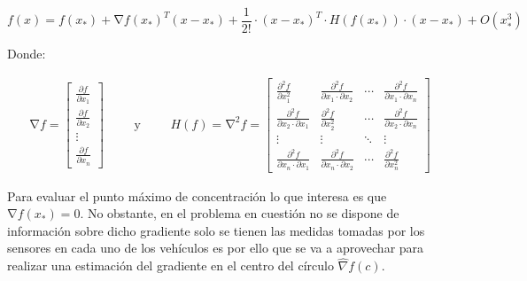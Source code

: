 \begin{equation}\label{TaylorNormal}
	f\left(x\right)=f\left(x_{*}\right)+\mathrm{\nabla}{f}{\left(x_{*}\right)}^{T}\left(x-x_{*}\right)+\frac{1}{2!}\cdot{\left(x-x_{*}\right)}^{T}\cdot{H}\left({f}\left(x_{*}\right)\right) 		\cdot\left(x-x_{*}\right)+O\left(x_{*}^3\right)
\end{equation}

Donde:

\begin{equation*}
	\begin{aligned}
		\mathrm{\nabla}{f}=
	\begin{bmatrix}
		\frac{\partial{f}}{\partial{x}_1} \\
		\frac{\partial{f}}{\partial{x}_2}  \\
		\vdots \\
		\frac{\partial{f}}{\partial{x}_n}
	\end{bmatrix}
	\end{aligned}
	\qquad\text{y}\qquad
	\begin{aligned}
	{H}\left(f\right)=\mathrm{\nabla}^{2}{f}= 	
	\begin{bmatrix}
		\frac{\partial^{2}{f}}{\partial{x}_{1}^{2}} & \frac{\partial^{2}{f}}{\partial{x}_{1}\cdot\partial{x}_{2}} & \cdots & \frac{\partial^{2}{f}}{\partial{x}_{1}\cdot\partial{x}_{n}}\\
		\frac{\partial^{2}{f}}{\partial{x}_{2}\cdot\partial{x}_{1}} & \frac{\partial^{2}{f}}{\partial{x}_{2}^{2}} & \cdots & \frac{\partial^{2}{f}}{\partial{x}_{2}\cdot\partial{x}_{n}}\\
		\vdots & \vdots & \ddots & \vdots\\
		\frac{\partial^{2}{f}}{\partial{x}_{n}\cdot\partial{x}_{1}} & \frac{\partial^{2}{f}}{\partial{x}_{n}\cdot\partial{x}_{2}} & \cdots & \frac{\partial^{2}{f}}{\partial{x}_{n}^{2}}
	\end{bmatrix}
	\end{aligned}
\end{equation*}

Para evaluar el punto máximo de concentración lo que interesa es que $\mathrm{\nabla}{f}{\left(x_{*}\right)}=0$. No obstante, en el problema en cuestión no se dispone de información sobre dicho gradiente solo se tienen las medidas tomadas por los sensores en cada uno de los vehículos es por ello que se va a aprovechar para realizar una estimación del gradiente en el centro del círculo $\hat{\nabla}{f}\left(c\right)$.

